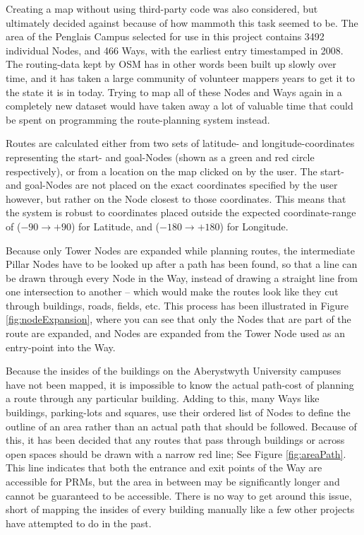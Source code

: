 Creating a map without using third-party code was also considered, but ultimately decided against because of how mammoth this task seemed to be. The area of the Penglais Campus selected for use in this project contains 3492 individual Nodes, and 466 Ways, with the earliest entry timestamped in 2008. The routing-data kept by OSM has in other words been built up slowly over time, and it has taken a large community of volunteer mappers years to get it to the state it is in today. Trying to map all of these Nodes and Ways again in a completely new dataset would have taken away a lot of valuable time that could be spent on programming the route-planning system instead.

Routes are calculated either from two sets of latitude- and longitude-coordinates representing the start- and goal-Nodes (shown as a green and red circle respectively), or from a location on the map clicked on by the user. The start- and goal-Nodes are not placed on the exact coordinates specified by the user however, but rather on the Node closest to those coordinates. This means that the system is robust to coordinates placed outside the expected coordinate-range of ($-90 \to +90$) for Latitude, and ($-180 \to +180$) for Longitude\cite{WGS84,OSGB,OSM_Convert-WGS84}.

Because only Tower Nodes are expanded while planning routes, the intermediate Pillar Nodes have to be looked up after a path has been found, so that a line can be drawn through every Node in the Way, instead of drawing a straight line from one intersection to another -- which would make the routes look like they cut through buildings, roads, fields, etc. This process has been illustrated in Figure \ref{fig:nodeExpansion}, where you can see that only the Nodes that are part of the route are expanded, and Nodes are expanded from the Tower Node used as an entry-point into the Way.

Because the insides of the buildings on the Aberystwyth University campuses have not been mapped, it is impossible to know the actual path-cost of planning a route through any particular building. Adding to this, many Ways like buildings, parking-lots and squares, use their ordered list of Nodes to define the outline of an area rather than an actual path that should be followed. Because of this, it has been decided that any routes that pass through buildings or across open spaces should be drawn with a narrow red line; See Figure \ref{fig:areaPath}. This line indicates that both the entrance and exit points of the Way are accessible for PRMs, but the area in between may be significantly longer and cannot be guaranteed to be accessible. There is no way to get around this issue, short of mapping the insides of every building manually like a few other projects have attempted to do in the past\cite{osm_research-projects}.

